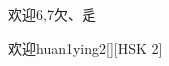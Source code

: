\begin{entry}{欢迎}{6,7}{⽋、⾡}
  \begin{phonetics}{欢迎}{huan1ying2}[][HSK 2]
  \end{phonetics}
\end{entry}
